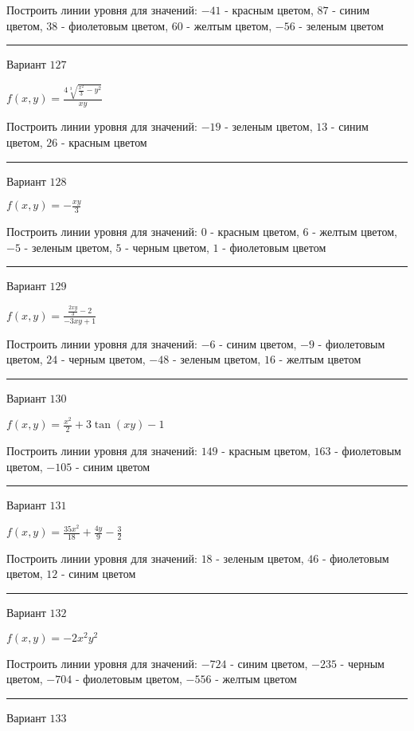 \documentclass[11pt]{report}
\begin{document}
Построить линии уровня для значений: $-41$ - красным цветом, $87$ - синим цветом, $38$ - фиолетовым цветом, $60$ - желтым цветом, $-56$ - зеленым цветом
\begin{center}
\noindent\rule{8cm}{0.4pt}
\end{center}
Вариант $127$


$f(x, y) = \frac{4 \sqrt[3]{\frac{x^{2}}{3} - y^{2}}}{x y}$

Построить линии уровня для значений: $-19$ - зеленым цветом, $13$ - синим цветом, $26$ - красным цветом
\begin{center}
\noindent\rule{8cm}{0.4pt}
\end{center}
Вариант $128$


$f(x, y) = - \frac{x y}{3}$

Построить линии уровня для значений: $0$ - красным цветом, $6$ - желтым цветом, $-5$ - зеленым цветом, $5$ - черным цветом, $1$ - фиолетовым цветом
\begin{center}
\noindent\rule{8cm}{0.4pt}
\end{center}
Вариант $129$


$f(x, y) = \frac{\frac{2 x y}{3} - 2}{- 3 x y + 1}$

Построить линии уровня для значений: $-6$ - синим цветом, $-9$ - фиолетовым цветом, $24$ - черным цветом, $-48$ - зеленым цветом, $16$ - желтым цветом
\begin{center}
\noindent\rule{8cm}{0.4pt}
\end{center}
Вариант $130$


$f(x, y) = \frac{x^{2}}{2} + 3 \tan{\left(x y \right)} - 1$

Построить линии уровня для значений: $149$ - красным цветом, $163$ - фиолетовым цветом, $-105$ - синим цветом
\begin{center}
\noindent\rule{8cm}{0.4pt}
\end{center}
Вариант $131$


$f(x, y) = \frac{35 x^{2}}{18} + \frac{4 y}{9} - \frac{3}{2}$

Построить линии уровня для значений: $18$ - зеленым цветом, $46$ - фиолетовым цветом, $12$ - синим цветом
\begin{center}
\noindent\rule{8cm}{0.4pt}
\end{center}
Вариант $132$


$f(x, y) = - 2 x^{2} y^{2}$

Построить линии уровня для значений: $-724$ - синим цветом, $-235$ - черным цветом, $-704$ - фиолетовым цветом, $-556$ - желтым цветом
\begin{center}
\noindent\rule{8cm}{0.4pt}
\end{center}
Вариант $133$
\end{document}
